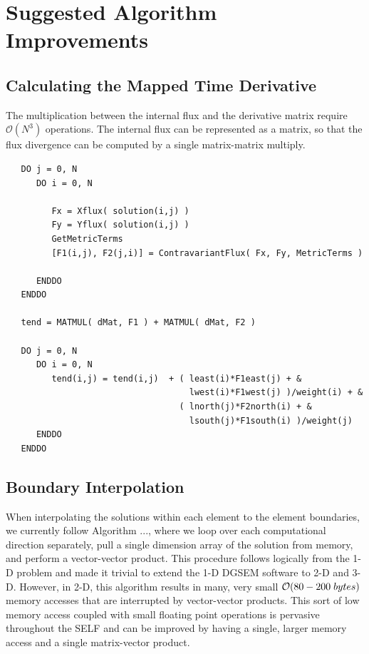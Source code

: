 \documentclass{softwaremanual}
\begin{document}
\clearpage

\section{Suggested Algorithm Improvements}

 \subsection{Calculating the Mapped Time Derivative}
  The multiplication between the internal flux and the derivative matrix require $\mathcal{O}(N^3)$ operations. The internal flux can be represented as a matrix, so that the flux divergence can be computed by a single matrix-matrix multiply.

 \begin{verbatim}
   DO j = 0, N
      DO i = 0, N
         
         Fx = Xflux( solution(i,j) )
         Fy = Yflux( solution(i,j) )
         GetMetricTerms
         [F1(i,j), F2(j,i)] = ContravariantFlux( Fx, Fy, MetricTerms )
        
      ENDDO
   ENDDO
   
   tend = MATMUL( dMat, F1 ) + MATMUL( dMat, F2 )
   
   DO j = 0, N
      DO i = 0, N
         tend(i,j) = tend(i,j)  + ( least(i)*F1east(j) + &
                                    lwest(i)*F1west(j) )/weight(i) + & 
                                  ( lnorth(j)*F2north(i) + &
                                    lsouth(j)*F1south(i) )/weight(j)
      ENDDO
   ENDDO
 \end{verbatim}
 
 \subsection{Boundary Interpolation}
 When interpolating the solutions within each element to the element boundaries, we currently
 follow Algorithm ..., where we loop over each computational direction separately, pull a single dimension array of the solution from memory, and perform a vector-vector product. This procedure follows logically from the 1-D problem and made it trivial to extend the 1-D DGSEM software to 2-D and 3-D. However, in 2-D, this algorithm results in many, very small $\mathcal{O}(80-200 \hspace{1mm} bytes)$ memory accesses that are interrupted by vector-vector products. This sort of low memory access coupled with small floating point operations is pervasive throughout the SELF and can be improved by having a single, larger memory access and a single matrix-vector product. 
 
\end{document}
